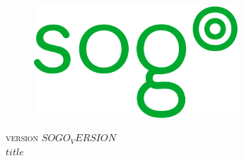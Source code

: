 \thispagestyle{empty}
\begin{figure}[htbp]
\includegraphics[height=4.20cm]{sogo.png}
\end{figure}

\begin{flushright}
\vfill
\textsc{version $SOGO_VERSION$}\\
\textsc{$title$}\\
\hspace{1.5cm}\hrulefill
\vfill
\end{flushright}
\newpage

